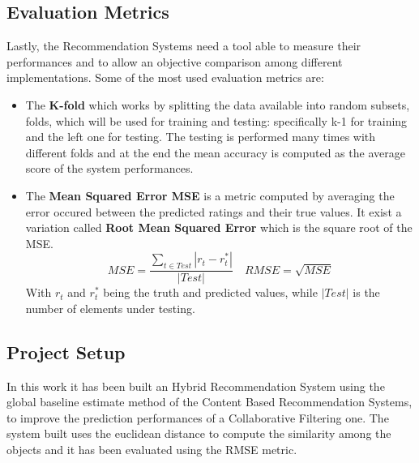 \subsection{Evaluation Metrics}
Lastly, the Recommendation Systems need a tool able to measure their
performances and to allow an objective comparison among different
implementations. Some of the most used evaluation metrics are:
\begin{itemize}
		\item The \textbf{K-fold} which works by splitting the data available into
		      random subsets, folds, which will be used for training and testing:
			  specifically k-1 for training and the left one for testing.
			  The testing is performed many
			  times with different folds and at the end the mean accuracy is
			  computed as the average score of the system performances.
		\item The \textbf{Mean Squared Error MSE} is a metric computed by
		      averaging the error occured between the predicted ratings and
			  their true values. It exist a variation called
			  \textbf{Root Mean Squared Error} which is the square root of the
			  MSE.
			  \begin{equation}
				MSE = \frac{\sum_{t\in Test}|r_{t}-r_{t}^{*}|}{|Test|} \quad 
				RMSE= \sqrt{MSE}
			  \end{equation}
				With $r_{t}$ and $r_{t}^{*}$ being the truth and predicted
				values, while $|Test|$ is the number of elements under testing.
\end{itemize}
\subsection{Project Setup}
In this work it has been built an Hybrid Recommendation System using
the global baseline estimate method of the Content Based Recommendation
Systems, to improve the prediction performances of a Collaborative Filtering
one.
The system built uses the euclidean distance to compute the similarity among
the objects and it has been evaluated using the RMSE metric.

